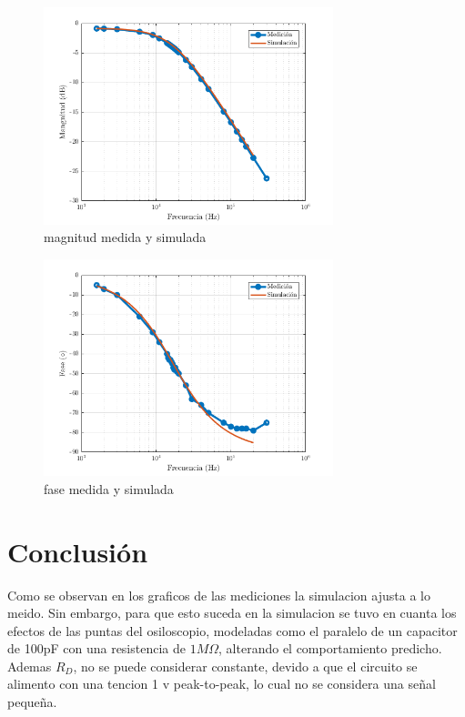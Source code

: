 \documentclass[../../e1_tp1_main.tex]{subfiles}
\begin{document}
\begin{figure}[H]
\centering
\includegraphics[width=0.75\textwidth]{imagenes/mag.png}
\caption{magnitud medida y simulada}
\end{figure}

\begin{figure}[H]
\centering
\includegraphics[width=0.75\textwidth]{imagenes/fase.png}
\caption{fase medida y simulada}
\end{figure}

\section{Conclusión}

Como se observan en los graficos de las mediciones la simulacion ajusta a lo meido. Sin embargo, para que esto suceda en la simulacion se tuvo en cuanta los efectos de las puntas del osiloscopio, modeladas como el paralelo de un capacitor de 100pF con una resistencia de $1M \Omega $, alterando el comportamiento predicho. Ademas $R_D$, no se puede considerar constante, devido a que el circuito se alimento con una tencion 1 v peak-to-peak, lo cual no se considera una señal pequeña.
\end{document}
